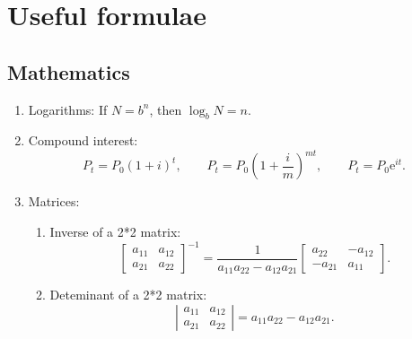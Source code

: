 \section{Useful formulae}

\subsection{Mathematics}

\begin{enumerate}
	\item Logarithms: If $N=b^{n}$, then $\log _{b}N=n.$
	
	\item Compound interest:%
	\begin{equation*}
	P_{t}=P_{0}\left( 1+i\right) ^{t},\qquad P_{t}=P_{0}\left( 1+\frac{i}{m}%
	\right) ^{mt},\qquad P_{t}=P_{0}\mathrm{e}^{it}.
	\end{equation*}
	
	\item Matrices:
	
	\begin{enumerate}
		\item Inverse of a 2*2 matrix:
		\begin{equation*}
		\left[
		\begin{array}{cc}
		a_{11} & a_{12} \\
		a_{21} & a_{22}%
		\end{array}%
		\right] ^{-1}=\frac{1}{a_{11}a_{22}-a_{12}a_{21}}\left[
		\begin{array}{cc}
		a_{22} & -a_{12} \\
		-a_{21} & a_{11}%
		\end{array}%
		\right] .
		\end{equation*}
		
		\item Deteminant of a 2*2 matrix:
		\begin{equation*}
		\left\vert
		\begin{array}{cc}
		a_{11} & a_{12} \\
		a_{21} & a_{22}%
		\end{array}%
		\right\vert =a_{11}a_{22}-a_{12}a_{21}.
		\end{equation*}
		

\end{enumerate}
\end{enumerate}
